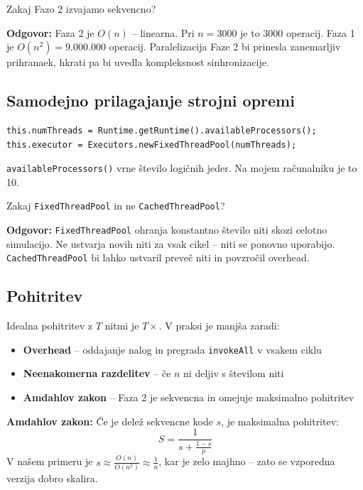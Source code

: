 \documentclass[12pt,a4paper]{article}
\begin{document}
\begin{vprasanje}
Zakaj Fazo 2 izvajamo sekvencno?

\textbf{Odgovor:} Faza 2 je $O(n)$ -- linearna. Pri $n = 3000$ je to 3000 operacij. Faza 1 je $O(n^2) = 9.000.000$ operacij. Paralelizacija Faze 2 bi prinesla zanemarljiv prihranaek, hkrati pa bi uvedla kompleksnost sinhronizacije.
\end{vprasanje}

\subsection{Samodejno prilagajanje strojni opremi}

\begin{lstlisting}
this.numThreads = Runtime.getRuntime().availableProcessors();
this.executor = Executors.newFixedThreadPool(numThreads);
\end{lstlisting}

\texttt{availableProcessors()} vrne \v{s}tevilo logi\v{c}nih jeder. Na mojem ra\v{c}unalniku je to 10.

\begin{vprasanje}
Zakaj \texttt{FixedThreadPool} in ne \texttt{CachedThreadPool}?

\textbf{Odgovor:} \texttt{FixedThreadPool} ohranja konstantno \v{s}tevilo niti skozi celotno simulacijo. Ne ustvarja novih niti za vsak cikel -- niti se ponovno uporabijo. \texttt{CachedThreadPool} bi lahko ustvaril preve\v{c} niti in povzro\v{c}il overhead.
\end{vprasanje}

\subsection{Pohitritev}

Idealna pohitritev z $T$ nitmi je $T\times$. V praksi je manj\v{s}a zaradi:
\begin{itemize}
    \item \textbf{Overhead} -- oddajanje nalog in pregrada \texttt{invokeAll} v vsakem ciklu
    \item \textbf{Neenakomerna razdelitev} -- \v{c}e $n$ ni deljiv s \v{s}tevilom niti
    \item \textbf{Amdahlov zakon} -- Faza 2 je sekvencna in omejuje maksimalno pohitritev
\end{itemize}

\begin{kljucno}
\textbf{Amdahlov zakon:} \v{C}e je dele\v{z} sekvencne kode $s$, je maksimalna pohitritev:
\[
S = \frac{1}{s + \frac{1-s}{p}}
\]
V na\v{s}em primeru je $s \approx \frac{O(n)}{O(n^2)} \approx \frac{1}{n}$, kar je zelo majhno -- zato se vzporedna verzija dobro skalira.
\end{kljucno}
\end{document}
